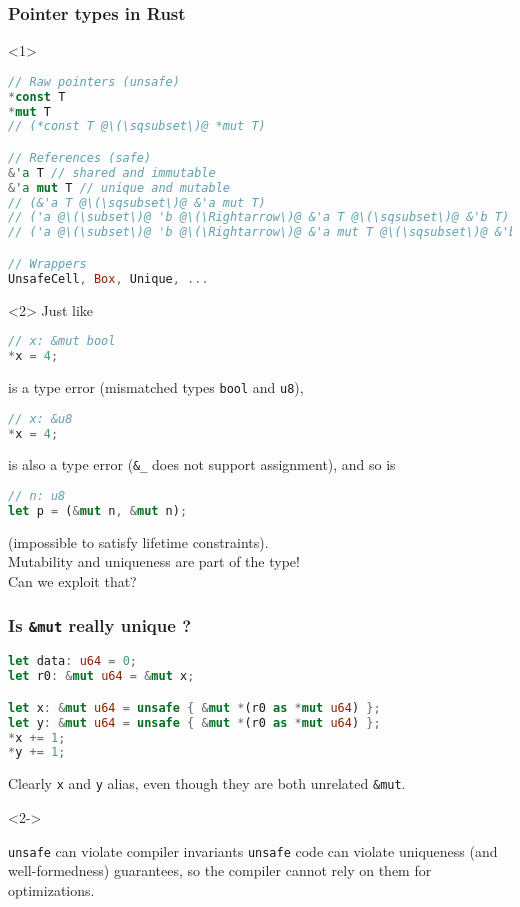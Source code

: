 \begin{frame}[fragile, t]
    \frametitle{Pointer types in Rust}
    \begin{onlyenv}<1>
        \begin{lstlisting}[language=rust, escapechar=@]
// Raw pointers (unsafe)
*const T
*mut T
// (*const T @\(\sqsubset\)@ *mut T)

// References (safe)
&'a T // shared and immutable
&'a mut T // unique and mutable
// (&'a T @\(\sqsubset\)@ &'a mut T)
// ('a @\(\subset\)@ 'b @\(\Rightarrow\)@ &'a T @\(\sqsubset\)@ &'b T)
// ('a @\(\subset\)@ 'b @\(\Rightarrow\)@ &'a mut T @\(\sqsubset\)@ &'b mut T)

// Wrappers
UnsafeCell, Box, Unique, ...
        \end{lstlisting}
    \end{onlyenv}

    \begin{onlyenv}<2>
        Just like
        \begin{lstlisting}[language=rust]
// x: &mut bool
*x = 4;
        \end{lstlisting}
        is a type error (mismatched types \texttt{bool} and \texttt{u8}),
        \begin{lstlisting}[language=rust]
// x: &u8
*x = 4;
        \end{lstlisting}
        is also a type error (\texttt{\&\_} does not support assignment),
        and so is
        \begin{lstlisting}[language=rust]
// n: u8
let p = (&mut n, &mut n);
        \end{lstlisting}
        (impossible to satisfy lifetime constraints).\\

        Mutability and uniqueness are part of the type!\\
        Can we exploit that?
    \end{onlyenv}
\end{frame}

\begin{frame}[fragile, t]
    \frametitle{Is \texttt{\&mut} really unique ?}
    \begin{lstlisting}[language=rust]
let data: u64 = 0;
let r0: &mut u64 = &mut x;

let x: &mut u64 = unsafe { &mut *(r0 as *mut u64) };
let y: &mut u64 = unsafe { &mut *(r0 as *mut u64) };
*x += 1;
*y += 1;
    \end{lstlisting}
    Clearly \texttt{x} and \texttt{y} alias, even though they
    are both unrelated \texttt{\&mut}.

    \begin{onlyenv}<2->
        \begin{block}{\texttt{unsafe} can violate compiler invariants}
            \texttt{unsafe} code can violate uniqueness (and well-formedness)
            guarantees, so the compiler cannot rely on them for optimizations.
        \end{block}
    \end{onlyenv}
\end{frame}

